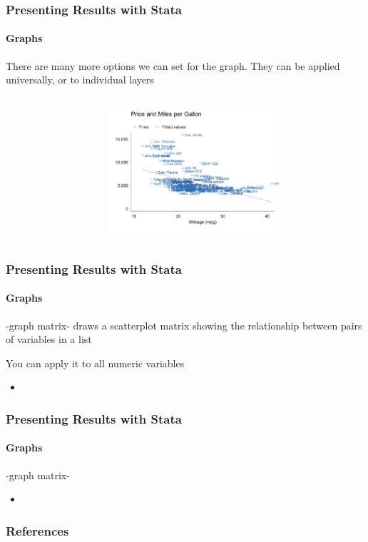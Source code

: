 \documentclass{beamer}
\begin{document}
\begin{frame}
  \frametitle{Presenting Results with Stata}
  \framesubtitle{Graphs}
There are many more options we can set for the graph. They can be applied universally, or to individual layers
\begin{columns}[onlytextwidth]
  \begin{column}{5.5cm}

  \end{column}
  \begin{column}{6cm}
\includegraphics[width=2.5in]{../../word/graph_options.PNG}
  \end{column}
\end{columns}

\end{frame}


\begin{frame}
  \frametitle{Presenting Results with Stata}
  \framesubtitle{Graphs}
-graph matrix- draws a scatterplot matrix showing the relationship between pairs of variables in a list

\medskip

You can apply it to all numeric variables
  \begin{itemize}
    \item 
  \end{itemize}
\end{frame}



\begin{frame}
  \frametitle{Presenting Results with Stata}
  \framesubtitle{Graphs}
-graph matrix-
  \begin{itemize}
    \item 
  \end{itemize}
\end{frame}

\begin{frame}
  \frametitle{References}


\end{frame}
\end{document}
